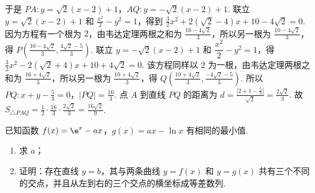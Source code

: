 \begin{solution}
\begin{enumerate}
于是 \(PA:y=\sqrt2(x-2)+1\)，\(AQ:y=-\sqrt2(x-2)+1\).
联立 \(y=\sqrt2(x-2)+1\) 和 \(\frac{x^2}{2}-y^2=1\)，得到 \(\frac32x^2+2\left(\sqrt2-4\right)x+10-4\sqrt2=0\).
因为方程有一个根为 \(2\)，由韦达定理两根之和为 \(\frac{16-4\sqrt2}{3}\)，所以另一根为 \(\frac{10-4\sqrt2}{3}\)，得 \(P\left(\frac{10-4\sqrt2}{3},\frac{4\sqrt2-5}{3}\right)\). 联立 \(y=-\sqrt2(x-2)+1\) 和 \(\dfrac{x^2}{2}-y^2=1\)，得 \(\frac32x^2-2\left(\sqrt2+4\right)x+10+4\sqrt2=0\). 该方程同样以 \(2\) 为一根，由韦达定理两根之和为 \(\frac{16+4\sqrt2}{3}\)，所以另一根为 \(\frac{10+4\sqrt2}{3}\)，得 \(Q\left(\frac{10+4\sqrt2}{3},\frac{-4\sqrt2-5}{3}\right)\).
所以 \(PQ:x+y-\frac53=0\)，\(|PQ|=\frac{16}{3}\).
点 \(A\) 到直线 \(PQ\) 的距离为 \(d=\frac{\left|2+1-\frac53\right|}{\sqrt2}=\frac{2\sqrt2}{3}\).
故 \(S_{\triangle PAQ}=\frac12\cdot \frac{16}{3}\cdot \frac{2\sqrt2}{3}=\frac{16\sqrt2}{9}\).
\end{enumerate}
\end{solution}

\begin{problem}
已知函数 \(f(x)=\e^x-ax\)，\(g(x)=ax-\ln x\) 有相同的最小值.

\begin{enumerate}
\item 求 \(a\)；

\item 证明：存在直线 \(y=b\)，其与两条曲线 \(y=f(x)\) 和 \(y=g(x)\) 共有三个不同的交点，并且从左到右的三个交点的横坐标成等差数列.
\end{enumerate}
\end{problem}

